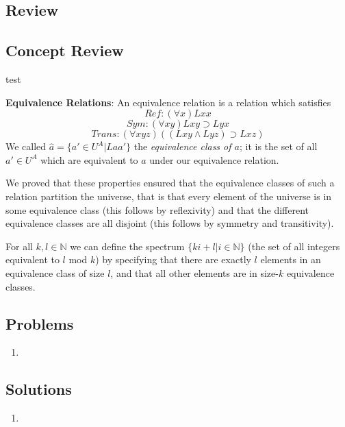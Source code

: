 \subsection{Review}
\begin{mdframed}[linewidth=1]
\section*{Concept Review}
test

\textbf{Equivalence Relations}: An equivalence relation is a relation which satisfies
\[
    Ref: (\forall x)Lxx
\]
\[
    Sym: (\forall xy)Lxy \supset Lyx
\]
\[
    Trans: (\forall xyz)((Lxy \land Lyz) \supset Lxz)
\]
We called $\hat{a} = \{a' \in U^A | Laa'\}$ the \emph{equivalence class of $a$}; it is the set of all $a' \in U^A$ which are equivalent to $a$ under our equivalence relation. 

We proved that these properties ensured that the equivalence classes of such a relation partition the universe, that is that every element of the universe is in some equivalence class (this follows by reflexivity) and that the different equivalence classes are all disjoint (this follows by symmetry and transitivity). 

For all $k, l \in \mathbb{N}$ we can define the spectrum $\{ki + l | i \in \mathbb{N}\}$ (the set of all integers equivalent to $l$ mod $k$) by specifying that there are exactly $l$ elements in an equivalence class of size $l$, and that all other elements are in size-$k$ equivalence classes. 

\end{mdframed}



\newpage
\begin{mdframed}[linewidth=1]
\section*{Problems}
\begin{enumerate}
    \item 


\end{enumerate}
\end{mdframed}

\newpage
\begin{mdframed}[linewidth=1]
\section*{Solutions}
\begin{enumerate}
    \item 
\end{enumerate}
\end{mdframed}